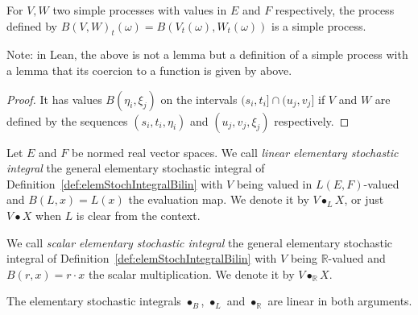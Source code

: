 \begin{lemma}\label{lem:simpleProcess_map2}
  \leanok
For $V, W$ two simple processes with values in $E$ and $F$ respectively, the process defined by $B(V, W)_t(\omega) = B(V_t(\omega), W_t(\omega))$ is a simple process.

Note: in Lean, the above is not a lemma but a definition of a simple process with a lemma that its coercion to a function is given by above.
\end{lemma}

\begin{proof}
  \leanok
It has values $B(\eta_i, \xi_j)$ on the intervals $(s_i, t_i] \cap (u_j, v_j]$ if $V$ and $W$ are defined by the sequences $(s_i, t_i, \eta_i)$ and $(u_j, v_j, \xi_j)$ respectively.
\end{proof}


\begin{definition}\label{def:elemStochIntegralLinear}
  \leanok
Let $E$ and $F$ be normed real vector spaces.
We call \emph{linear elementary stochastic integral} the general elementary stochastic integral of Definition~\ref{def:elemStochIntegralBilin} with $V$ being valued in $L(E, F)$-valued and $B(L, x) = L(x)$ the evaluation map.
We denote it by $V \bullet_L X$,
or just $V \bullet X$ when $L$ is clear from the context.
\end{definition}


\begin{definition}\label{def:elemStochIntegral}
We call \emph{scalar elementary stochastic integral} the general elementary stochastic integral of Definition~\ref{def:elemStochIntegralBilin} with $V$ being $\mathbb{R}$-valued and $B(r, x) = r \cdot x$ the scalar multiplication.
We denote it by $V \bullet_{\mathbb{R}} X$.
\end{definition}


\begin{lemma}\label{lem:elemStochIntegral_linear}
  \leanok
The elementary stochastic integrals $\bullet_B$, $\bullet_L$ and $\bullet_{\mathbb{R}}$ are linear in both arguments.
\end{lemma}

